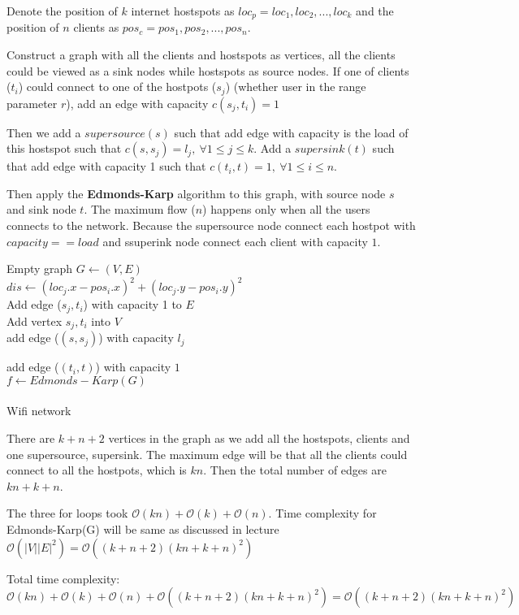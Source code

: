 \documentclass{assignment}
\begin{document}
   \begin{homeworkProblem}	
   	    	Denote the position of $k$ internet hostspots as $loc_p = {loc_1, loc_2, ...,loc_k}$ and the position of $n$ clients as $pos_c = {pos_1, pos_2, ..., pos_n}$. 

Construct a graph with all the clients and hostspots as vertices, all the clients could be viewed as a sink nodes while hostspots as source nodes. If one of clients ($t_i$) could connect to one of the hostpots ($s_j$) (whether user in the range parameter $r$), add an edge with capacity $c(s_j,t_i)=1$

Then we add a $supersource(s)$ such that add edge with capacity is the load of this hostspot such that $c(s,s_j)=l_j,\ \forall 1\leq j \leq k$. Add a $supersink(t)$ such that add edge with capacity 1 such that $c(t_i, t)=1,\ \forall 1 \leq i \leq n$. 

Then apply the \textbf{Edmonds-Karp} algorithm to this graph, with source node $s$ and sink node $t$. The maximum flow ($n$) happens only when all the users connects to the network. Because the supersource node connect each hostpot with $capacity==load $ and ssuperink node connect each client with capacity $1$. 

	     \begin{algorithm}[H]
 \BlankLine

Empty graph $G\leftarrow (V,E)$ \\
 {
 {
$dis\leftarrow (loc_j.x-pos_i.x)^2 + (loc_j.y-pos_i.y)^2$ \\
	 {
		Add edge ($s_j,t_i$) with capacity 1 to $E$\\	
	}
	Add vertex $s_j, t_i$ into $V$\\
}
}
 {
add edge ($(s, s_j)$) with capacity $l_j$ \\
}

 {
add edge ($(t_i, t)$) with capacity $1$ \\
}
$f\leftarrow Edmonds-Karp(G)$\\
 \\
\caption{Wifi network} \end{algorithm}
    
There are $k+n+2$ vertices in the graph as we add all the hostspots, clients and one supersource, supersink. The maximum edge will be that all the clients could connect to all the hostpots, which is $kn$. Then the total number of edges are $kn+k+n$. 

The three for loops took $\mathcal{O}(kn)+\mathcal{O}(k)+\mathcal{O}(n)$. Time complexity for Edmonds-Karp(G) will be same as discussed in lecture $\mathcal{O}(|V||E|^2)=\mathcal{O}((k+n+2)(kn+k+n)^2)$

Total time complexity:     $\mathcal{O}(kn)+\mathcal{O}(k)+\mathcal{O}(n)+\mathcal{O}((k+n+2)(kn+k+n)^2)=\mathcal{O}((k+n+2)(kn+k+n)^2)$
	\end{homeworkProblem}
\end{document}
